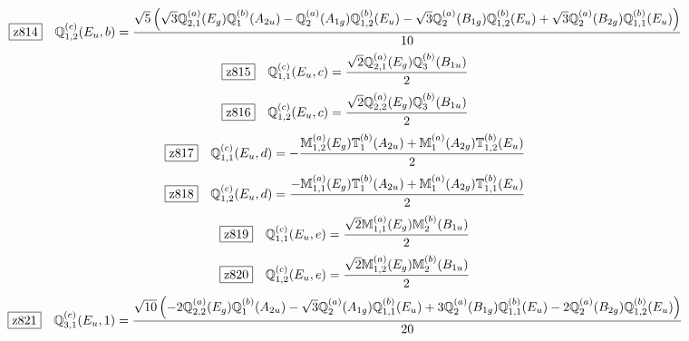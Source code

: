 \documentclass[fleqn,10pt,landscape]{jsarticle}
\begin{document}
\begin{dmath*}
\hspace*{3mm}\fbox{z814}\quad \mathbb{Q}_{1,2}^{(c)}(E_{u},b)=\frac{\sqrt{5} \left(\sqrt{3} \mathbb{Q}_{2,1}^{(a)}(E_{g}) \mathbb{Q}_{1}^{(b)}(A_{2u}) - \mathbb{Q}_{2}^{(a)}(A_{1g}) \mathbb{Q}_{1,2}^{(b)}(E_{u}) - \sqrt{3} \mathbb{Q}_{2}^{(a)}(B_{1g}) \mathbb{Q}_{1,2}^{(b)}(E_{u}) + \sqrt{3} \mathbb{Q}_{2}^{(a)}(B_{2g}) \mathbb{Q}_{1,1}^{(b)}(E_{u})\right)}{10}
\end{dmath*}
\begin{dmath*}
\hspace*{3mm}\fbox{z815}\quad \mathbb{Q}_{1,1}^{(c)}(E_{u},c)=\frac{\sqrt{2} \mathbb{Q}_{2,1}^{(a)}(E_{g}) \mathbb{Q}_{3}^{(b)}(B_{1u})}{2}
\end{dmath*}
\begin{dmath*}
\hspace*{3mm}\fbox{z816}\quad \mathbb{Q}_{1,2}^{(c)}(E_{u},c)=\frac{\sqrt{2} \mathbb{Q}_{2,2}^{(a)}(E_{g}) \mathbb{Q}_{3}^{(b)}(B_{1u})}{2}
\end{dmath*}
\begin{dmath*}
\hspace*{3mm}\fbox{z817}\quad \mathbb{Q}_{1,1}^{(c)}(E_{u},d)=- \frac{\mathbb{M}_{1,2}^{(a)}(E_{g}) \mathbb{T}_{1}^{(b)}(A_{2u}) + \mathbb{M}_{1}^{(a)}(A_{2g}) \mathbb{T}_{1,2}^{(b)}(E_{u})}{2}
\end{dmath*}
\begin{dmath*}
\hspace*{3mm}\fbox{z818}\quad \mathbb{Q}_{1,2}^{(c)}(E_{u},d)=\frac{- \mathbb{M}_{1,1}^{(a)}(E_{g}) \mathbb{T}_{1}^{(b)}(A_{2u}) + \mathbb{M}_{1}^{(a)}(A_{2g}) \mathbb{T}_{1,1}^{(b)}(E_{u})}{2}
\end{dmath*}
\begin{dmath*}
\hspace*{3mm}\fbox{z819}\quad \mathbb{Q}_{1,1}^{(c)}(E_{u},e)=\frac{\sqrt{2} \mathbb{M}_{1,1}^{(a)}(E_{g}) \mathbb{M}_{2}^{(b)}(B_{1u})}{2}
\end{dmath*}
\begin{dmath*}
\hspace*{3mm}\fbox{z820}\quad \mathbb{Q}_{1,2}^{(c)}(E_{u},e)=\frac{\sqrt{2} \mathbb{M}_{1,2}^{(a)}(E_{g}) \mathbb{M}_{2}^{(b)}(B_{1u})}{2}
\end{dmath*}
\begin{dmath*}
\hspace*{3mm}\fbox{z821}\quad \mathbb{Q}_{3,1}^{(c)}(E_{u},1)=\frac{\sqrt{10} \left(- 2 \mathbb{Q}_{2,2}^{(a)}(E_{g}) \mathbb{Q}_{1}^{(b)}(A_{2u}) - \sqrt{3} \mathbb{Q}_{2}^{(a)}(A_{1g}) \mathbb{Q}_{1,1}^{(b)}(E_{u}) + 3 \mathbb{Q}_{2}^{(a)}(B_{1g}) \mathbb{Q}_{1,1}^{(b)}(E_{u}) - 2 \mathbb{Q}_{2}^{(a)}(B_{2g}) \mathbb{Q}_{1,2}^{(b)}(E_{u})\right)}{20}
\end{dmath*}
\end{document}
